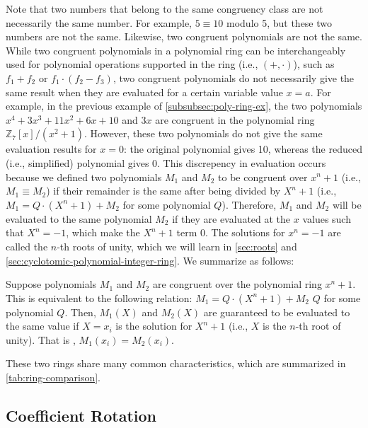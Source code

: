  Note that two numbers that belong to the same congruency class are not necessarily the same number. For example, $5 \equiv 10$ modulo 5, but these two numbers are not the same. Likewise, two congruent polynomials are not the same. While two congruent polynomials in a polynomial ring can be interchangeably used for polynomial operations supported in the ring (i.e., $(+, \cdot)$), such as $f_1 + f_2$ or $f_1 \cdot (f_2 - f_3)$, two congruent polynomials do not necessarily give the same result when they are evaluated for a certain variable value $x = a$. For example, in the previous example of \autoref{subsubsec:poly-ring-ex}, the two polynomials $x^4 + 3x^3 + 11x^2 + 6x + 10$ and $3x$ are congruent in the polynomial ring $\mathbb{Z}_7[x] / (x^2 + 1)$. However, these two polynomials do not give the same evaluation results for $x = 0$: the original polynomial gives 10, whereas the reduced (i.e., simplified) polynomial gives 0. This discrepency in evaluation occurs because we defined two polynomials $M_1$ and $M_2$ to be congruent over $x^n + 1$ (i.e., $M_1 \equiv M_2$) if their remainder is the same after being divided by $X^n + 1$ (i.e., $M_1 = Q \cdot (X^n + 1) + M_2$ for some polynomial $Q$). Therefore, $M_1$ and $M_2$ will be evaluated to the same polynomial $M_2$ if they are evaluated at the $x$ values such that $X^n = -1$, which make the $X^n +1$ term 0. The solutions for $x^n = -1$ are called the $n$-th roots of unity, which we will learn in \autoref{sec:roots} and \autoref{sec:cyclotomic-polynomial-integer-ring}. We summarize as follows: 

\begin{tcolorbox}[title={\textbf{\tboxlabel{\ref*{subsubsec:polynomial-ring-discuss}} Polynomial Evaluation over Polynomial Ring}}]

Suppose polynomials $M_1$ and $M_2$ are congruent over the polynomial ring $x^n + 1$. This is equivalent to the following relation: $M_1 = Q \cdot (X^n + 1) + M_2$ $Q$ for some polynomial $Q$. Then, $M_1(X)$ and $M_2(X)$ are guaranteed to be evaluated to the same value if $X=x_i$ is the solution for $X^n + 1$ (i.e., $X$ is the $n$-th root of unity). That is , $M_1(x_i) = M_2(x_i)$. 

\end{tcolorbox}

 These two rings share many common characteristics, which are summarized in \autoref{tab:ring-comparison}. 


\subsection{Coefficient Rotation}
\label{subsec:coeff-rotation}

